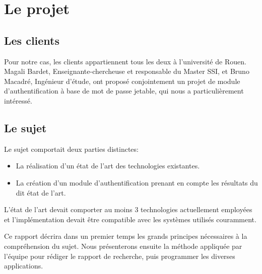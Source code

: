  
\section{Le projet}


\subsection{Les clients}
Pour notre cas, les clients appartiennent tous les deux à l'université de Rouen. Magali Bardet, Enseignante-chercheuse et responsable du Master SSI, et Bruno Macadré, Ingénieur d'étude, ont proposé conjointement un projet de module d'authentification à base de mot de passe jetable, qui nous a particulièrement intéressé.
\newpage

\subsection{Le sujet}

Le sujet comportait deux parties distinctes: 
\begin{itemize}
\item La réalisation d'un état de l'art des technologies existantes.
\item La création d'un module d'authentification prenant en compte les résultats du dit état de l'art.
\end{itemize}

L'état de l'art devait comporter au moins 3 technologies actuellement employées et l'implémentation devait être compatible avec les systèmes utilisés couramment.
\newline

Ce rapport décrira dans un premier temps les grands principes nécessaires à la compréhension du sujet. Nous présenterons ensuite la méthode appliquée par l'équipe pour rédiger le rapport de recherche, puis programmer les diverses applications. 